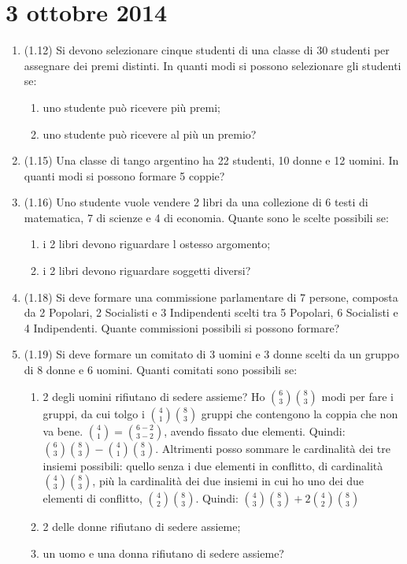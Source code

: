 \section{3 ottobre 2014}

\begin{enumerate}
    \item (1.12) Si devono selezionare cinque studenti di una classe di 30 studenti per assegnare dei premi distinti. In quanti modi si possono selezionare gli studenti se:
    \begin{enumerate}
        \item uno studente pu\`o ricevere pi\`u premi;
        \item uno studente pu\`o ricevere al pi\`u un premio?
    \end{enumerate}
    \item (1.15) Una classe di tango argentino ha 22 studenti, 10 donne e 12 uomini. In quanti modi si possono formare 5 coppie?
    \item (1.16) Uno studente vuole vendere 2 libri da una collezione di 6 testi di matematica, 7 di scienze e 4 di economia. Quante sono le scelte possibili se:
    \begin{enumerate}
        \item i 2 libri devono riguardare l ostesso argomento;
        \item i 2 libri devono riguardare soggetti diversi?
    \end{enumerate}
    \item (1.18) Si deve formare una commissione parlamentare di 7 persone, composta da 2 Popolari, 2 Socialisti e 3 Indipendenti scelti tra 5 Popolari, 6 Socialisti e 4 Indipendenti. Quante commissioni possibili si possono formare?
    \item (1.19) Si deve formare un comitato di 3 uomini e 3 donne scelti da un gruppo di 8 donne e 6 uomini. Quanti comitati sono possibili se:
    \begin{enumerate}
        \item 2 degli uomini rifiutano di sedere assieme? Ho $\binom{6}{3}\binom{8}{3}$ modi per fare i gruppi, da cui tolgo i $\binom{4}{1}\binom{8}{3}$ gruppi che contengono la coppia che non va bene. $\binom{4}{1} = \binom{6-2}{3-2}$, avendo fissato due elementi. Quindi: $\binom{6}{3} \binom{8}{3} - \binom{4}{1} \binom{8}{3}$. Altrimenti posso sommare le cardinalit\`a dei tre insiemi possibili: quello senza i due elementi in conflitto, di cardinalit\`a $\binom{4}{3}\binom{8}{3}$, pi\`u la cardinalit\`a dei due insiemi in cui ho uno dei due elementi di conflitto, $\binom{4}{2}\binom{8}{3}$. Quindi: $\binom{4}{3} \binom{8}{3} + 2 \binom{4}{2} \binom{8}{3}$
        \item 2 delle donne rifiutano di sedere assieme;
        \item un uomo e una donna rifiutano di sedere assieme?
    \end{enumerate}
\end{enumerate}

